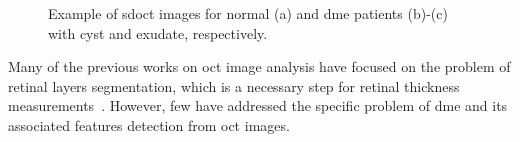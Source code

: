 \begin{figure}
\begin{center}
\hspace*{\fill}
\end{center}
\caption{ Example of \ac{sdoct} images for normal (a) and \ac{dme} patients (b)-(c) with cyst and exudate, respectively.}
\label{fig:dme-normal}
\end{figure}
\begin{changebar}
Many of the previous works on \ac{oct} image analysis have focused on the problem of retinal layers segmentation, which is a necessary step for retinal
thickness measurements~\cite{Chiu2010,Kafieh2013}.
However, few have addressed the specific problem of \ac{dme} and its associated features detection from \ac{oct} images.
\end{changebar}

